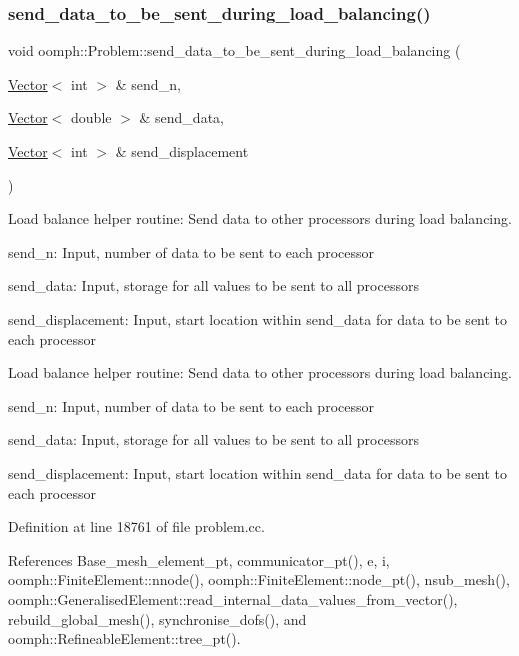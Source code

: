 \subsubsection{\texorpdfstring{send\+\_\+data\+\_\+to\+\_\+be\+\_\+sent\+\_\+during\+\_\+load\+\_\+balancing()}{send\_data\_to\_be\_sent\_during\_load\_balancing()}}
{\footnotesize\ttfamily void oomph\+::\+Problem\+::send\+\_\+data\+\_\+to\+\_\+be\+\_\+sent\+\_\+during\+\_\+load\+\_\+balancing (\begin{DoxyParamCaption}\item[{\hyperlink{classoomph_1_1Vector}{Vector}$<$ int $>$ \&}]{send\+\_\+n,  }\item[{\hyperlink{classoomph_1_1Vector}{Vector}$<$ double $>$ \&}]{send\+\_\+data,  }\item[{\hyperlink{classoomph_1_1Vector}{Vector}$<$ int $>$ \&}]{send\+\_\+displacement }\end{DoxyParamCaption})\hspace{0.3cm}{\ttfamily [private]}}



Load balance helper routine\+: Send data to other processors during load balancing. 


\begin{DoxyItemize}
\item send\+\_\+n\+: Input, number of data to be sent to each processor
\item send\+\_\+data\+: Input, storage for all values to be sent to all processors
\item send\+\_\+displacement\+: Input, start location within send\+\_\+data for data to be sent to each processor
\end{DoxyItemize}

Load balance helper routine\+: Send data to other processors during load balancing.
\begin{DoxyItemize}
\item send\+\_\+n\+: Input, number of data to be sent to each processor
\item send\+\_\+data\+: Input, storage for all values to be sent to all processors
\item send\+\_\+displacement\+: Input, start location within send\+\_\+data for data to be sent to each processor 
\end{DoxyItemize}

Definition at line 18761 of file problem.\+cc.



References Base\+\_\+mesh\+\_\+element\+\_\+pt, communicator\+\_\+pt(), e, i, oomph\+::\+Finite\+Element\+::nnode(), oomph\+::\+Finite\+Element\+::node\+\_\+pt(), nsub\+\_\+mesh(), oomph\+::\+Generalised\+Element\+::read\+\_\+internal\+\_\+data\+\_\+values\+\_\+from\+\_\+vector(), rebuild\+\_\+global\+\_\+mesh(), synchronise\+\_\+dofs(), and oomph\+::\+Refineable\+Element\+::tree\+\_\+pt().



